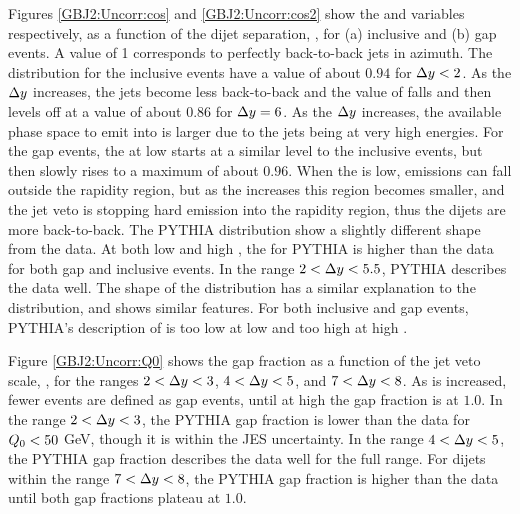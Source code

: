 Figures \ref{GBJ2:Uncorr:cos} and \ref{GBJ2:Uncorr:cos2} show the \mean{\cosdphi{}} and \mean{\costwodphi{}} variables respectively, as a function of the dijet separation, \dy{}, for (a) inclusive and (b) gap events.
A \mean{\cosdphi{}} value of 1 corresponds to perfectly back-to-back jets in azimuth.
The \mean{\cosdphi{}} distribution for the inclusive events have a value of about $0.94$ for $\mbox{$\Delta y$}{}<2$.
As the $\mbox{$\Delta y$}{}$ increases, the jets become less back-to-back and the value of \mean{\cosdphi{}} falls and then levels off at a value of about $0.86$ for $\mbox{$\Delta y$}{}=6$.
As the $\mbox{$\Delta y$}{}$ increases, the available phase space to emit into is larger due to the jets being at very high energies.
For the gap events, the \mean{\cosdphi{}} at low \dy{} starts at a similar level to the inclusive events, but then slowly rises to a maximum of about $0.96$.
When the \dy{} is low, emissions can fall outside the rapidity region, but as the \dy{} increases this region becomes smaller, and the jet veto is stopping hard emission into the rapidity region, thus the dijets are more back-to-back.
The PYTHIA distribution show a slightly different shape from the data.
At both low and high \dy{}, the \mean{\cosdphi{}} for PYTHIA is higher than the data for both gap and inclusive events. 
In the range $2<\mbox{$\Delta y$}{}<5.5$, PYTHIA describes the data well.
The shape of the \mean{\costwodphi{}} distribution has a similar explanation to the \mean{\cosdphi{}} distribution, and shows similar features.
For both inclusive and gap events, PYTHIA's description of \mean{\costwodphi{}} is too low at low \dy{} and too high at high \dy{}.

Figure \ref{GBJ2:Uncorr:Q0} shows the gap fraction as a function of the jet veto scale, \qz{}, for the \dy{} ranges $2<\mbox{$\Delta y$}{}<3$, $4<\mbox{$\Delta y$}{}<5$, and $7<\mbox{$\Delta y$}{}<8$.
As \qz{} is increased, fewer events are defined as gap events, until at high \qz{} the gap fraction is at $1.0$.
In the range $2<\mbox{$\Delta y$}{}<3$, the PYTHIA gap fraction is lower than the data for $\mbox{$Q_0$}{}<50$ GeV, though it is within the JES uncertainty.
In the range $4<\mbox{$\Delta y$}{}<5$, the PYTHIA gap fraction describes the data well for the full \qz{} range.
For dijets within the range $7<\mbox{$\Delta y$}{}<8$, the PYTHIA gap fraction is higher than the data until both gap fractions plateau at $1.0$.

